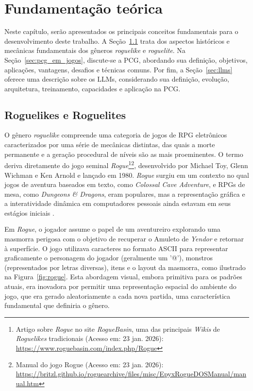 \chapter{Fundamentação teórica}
\label{cap:fundamentacao-teorica}

Neste capítulo, serão apresentados os principais conceitos fundamentais para o
desenvolvimento deste trabalho. A Seção~\ref{sec:roguelike-roguelites} trata dos
aspectos históricos e mecânicas fundamentais dos gêneros \textit{roguelike} e
\textit{roguelite}.  Na Seção~\ref{sec:pcg_em_jogos}, discute-se a \gls{PCG},
abordando sua definição, objetivos, aplicações, vantagens, desafios e técnicas
comuns. Por fim, a Seção~\ref{sec:llms} oferece uma descrição sobre os
\gls{LLM}s, considerando sua definição, evolução, arquitetura, treinamento,
capacidades e aplicação na \gls{PCG}.

\section{Roguelikes e Roguelites}
\label{sec:roguelike-roguelites}

O gênero \textit{roguelike} compreende uma categoria de jogos de \gls{RPG}
eletrônicos caracterizados por uma série de mecânicas distintas, das quais a
morte permanente e a geração procedural de níveis são as mais proeminentes. O
termo deriva diretamente do jogo seminal \textit{Rogue}\footnote{Artigo sobre
	\textit{Rogue} no site \textit{RogueBasin}, uma das principais \textit{Wikis} de
	\textit{Roguelikes} tradicionais (Acesso em: 23 jan. 2026): \url{https://www.roguebasin.com/index.php/Rogue}}\footnote{Manual
	do jogo Rogue (Acesso em: 23 jan. 2026): \url{https://britzl.github.io/roguearchive/files/misc/EpyxRogueDOSManual/manual.htm}},
desenvolvido por Michael Toy, Glenn Wichman e Ken Arnold e lançado em 1980.
\textit{Rogue} surgiu em um contexto no qual jogos de aventura baseados em
texto, como \textit{Colossal Cave Adventure}, e \gls{RPG}s de mesa, como
\textit{Dungeons \& Dragons}, eram populares, mas a representação gráfica e a
interatividade dinâmica em computadores pessoais ainda estavam em seus estágios
iniciais \cite{harris2020exploring}.

Em \textit{Rogue}, o jogador assume o papel de um aventureiro explorando uma
masmorra perigosa com o objetivo de recuperar o Amuleto de \textit{Yendor} e retornar à
superfície. O jogo utilizava caracteres no formato \gls{ASCII} para representar
graficamente o personagem do jogador (geralmente um '@'), monstros
(representados por letras diversas), itens e o layout da masmorra, como
ilustrado na Figura~\ref{fig:rogue}. Esta abordagem visual, embora primitiva
para os padrões atuais, era inovadora por permitir uma representação espacial do
ambiente do jogo, que era gerado aleatoriamente a cada nova partida, uma
característica fundamental que definiria o gênero.

